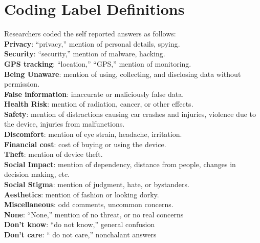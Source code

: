 \section{Coding Label Definitions}
\label{sec:coding}
Researchers coded the self reported answers as follows:\\
{\bf Privacy}: ``privacy,'' mention of personal details, spying. \\
{\bf Security}:  ``security,'' mention of malware, hacking. \\
{\bf GPS tracking}: ``location,'' ``GPS,'' mention of monitoring. \\
{\bf Being Unaware}: mention of using, collecting, and disclosing data without permission. \\
{\bf False information}: inaccurate or maliciously false data.\\
{\bf Health Risk}: mention of radiation, cancer, or other effects.\\
{\bf Safety}: mention of distractions causing car crashes and injuries, violence due to the device, injuries from malfunctions.\\
{\bf Discomfort}: mention of eye strain, headache, irritation. \\
{\bf Financial cost}: cost of buying or using the device. \\
{\bf Theft}: mention of device theft. \\
{\bf Social Impact}: mention of dependency, distance from people, changes in decision making, etc. \\
{\bf Social Stigma}: mention of judgment, hate, or bystanders.\\ 
{\bf Aesthetics}: mention of fashion or looking dorky. \\
{\bf Miscellaneous}: odd comments, uncommon concerns. \\
{\bf None}: ``None,'' mention of no threat, or no real concerns \\
{\bf Don't know}: ``do not know,'' general confusion \\
{\bf Don't care}: `` do not care,'' nonchalant answers 

